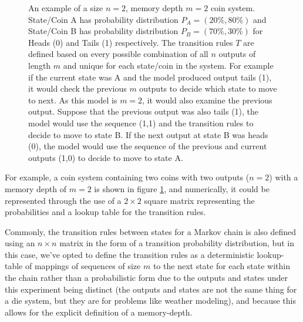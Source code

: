\documentclass[12pt]{article}
\begin{document}
\begin{figure}[H]
\centering

\label{fig:coin-system-example}
\caption{An example of a size $n=2$, memory depth $m=2$ coin system. State/Coin A has probability distribution $P_{A}=(20\%, 80\%)$ and State/Coin B has probability distribution $P_{B} = (70\%,30\%)$ for Heads (0) and Tails (1) respectively. The transition rules $T$ are defined based on every possible combination of all $n$ outputs of length $m$ and unique for each state/coin in the system. For example if the current state was A and the model produced output tails (1), it would check the previous $m$ outputs to decide which state to move to next. As this model is $m=2$, it would also examine the previous output. Suppose that the previous output was also tails (1), the model would use the sequence (1,1) and the transition rules to decide to move to state B. If the next output at state B was heads (0), the model would use the sequence of the previous and current outputs (1,0) to decide to move to state A.}
\end{figure}

For example, a coin system containing two coins with two outputs ($n=2$) with a memory depth of $m=2$ is shown in figure \ref{fig:coin-system-example}, and numerically, it could be represented through the use of a $2 \times 2$ square matrix representing the probabilities and a lookup table for the transition rules.

\begin{table}[H]
\centering

\label{tbl:coin-system-numerical-description}
\caption{A continuation of the example shown in figure \ref{fig:coin-system-example}, displaying the probabilities $P$ as a square matrix of size $n \times n$ and the transition rules as a lookup table mapping a series of outputs $m$ long to the next coin in the chain based on the present coin.}
\end{table}

Commonly, the transition rules between states for a Markov chain is also defined using an $n \times n$ matrix in the form of a transition probability distribution, but in this case, we've opted to define the transition rules as a deterministic lookup-table of mappings of sequences of size $m$ to the next state for each state within the chain rather than a probabilistic form due to the outputs and states under this experiment being distinct (the outputs and states are not the same thing for a die system, but they are for problems like weather modeling), and because this allows for the explicit definition of a memory-depth.
\end{document}
